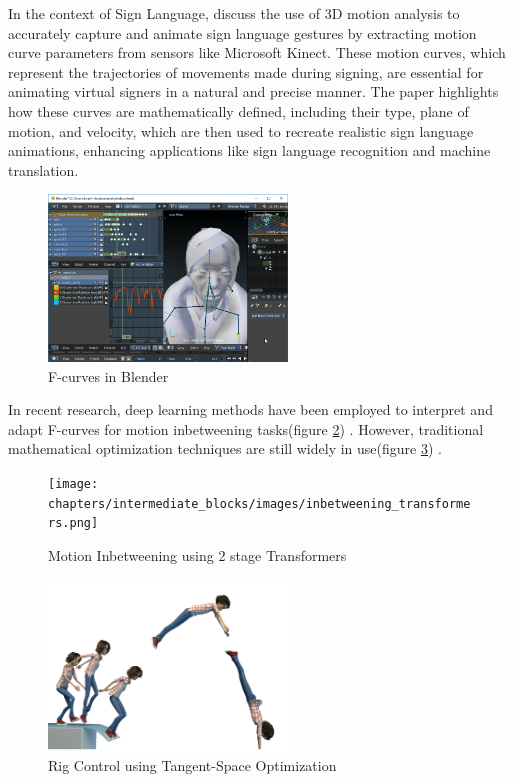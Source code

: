 \documentclass[../../main.tex]{subfiles}
\begin{document}
In the context of Sign Language, \cite{inproceedings} discuss the use of 3D motion analysis to accurately capture and animate sign language gestures by extracting motion curve parameters from sensors like Microsoft Kinect. These motion curves, which represent the trajectories of movements made during signing, are essential for animating virtual signers in a natural and precise manner. The paper highlights how these curves are mathematically defined, including their type, plane of motion, and velocity, which are then used to recreate realistic sign language animations, enhancing applications like sign language recognition and machine translation.

\begin{figure}
    \centering \includegraphics[width = 2.5in]{chapters/intermediate_blocks/images/fcurves_blender.png}
    \caption{F-curves in Blender}
    \label{fig:fcurves_blender}
\end{figure}

In recent research, deep learning methods have been employed to interpret and adapt F-curves for motion inbetweening tasks(figure \ref{fig:inbetweening_transformers}) \cite{10.1145/3550454.3555454}. However, traditional mathematical optimization techniques are still widely in use(figure \ref{fig:inbetweening_disney}) \cite{10.1145/3306346.3322938}.

\begin{figure}
    \centering \texttt{[image: chapters/intermediate\_blocks/images/inbetweening\_transformers.png]}
    \caption{Motion Inbetweening using 2 stage Transformers \cite{10.1145/3306346.3322938}}
    \label{fig:inbetweening_transformers}
\end{figure}

\begin{figure}
    \centering \includegraphics[width = 2.5in]{chapters/intermediate_blocks/images/inbetweening_disney.png}
    \caption{Rig Control using Tangent-Space Optimization}
    \label{fig:inbetweening_disney}
\end{figure}
\end{document}
